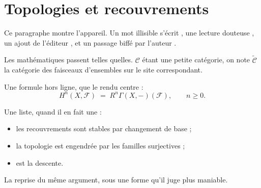 \documentclass[11pt,a4paper]{article}
\begin{document}
\section{Topologies et recouvrements}

Ce paragraphe montre l'appareil. Un mot illisible s'écrit \ill{}, une lecture
douteuse , un ajout de l'éditeur , et un passage
biffé par l'auteur .

Les mathématiques passent telles quelles. $\mathcal{C}$ étant une petite
catégorie, on note $\widetilde{\mathcal{C}}$ la catégorie des faisceaux
d'ensembles sur le site correspondant.

Une formule hors ligne, que le rendu centre :
\[
  H^n(X, \mathcal{F}) \;=\; R^n \Gamma(X, -)(\mathcal{F}),
  \qquad n \geqslant 0 .
\]

Une liste, quand il en fait une :
\begin{itemize}
  \item les recouvrements sont stables par changement de base ;
  \item la topologie est engendrée par les familles surjectives ;
  \item {} est la descente.
\end{itemize}


La reprise du même argument, sous une forme qu'il juge plus maniable.
\end{document}
